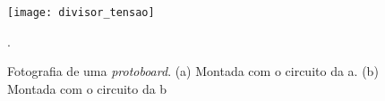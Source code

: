 \begin{figure}[htbp]
\begin{center}
\texttt{[image: divisor\_tensao]}
\caption{Fotografia de uma \textit{protoboard}. (a) Montada com o circuito da \fig{\ref{fig:divisor_tensao}}a.  (b) Montada com o circuito da \fig{\ref{fig:divisor_ tensao}}b}.
\label{fig:protoboard}
\end{center}
\end{figure}
\vspace{-10pt}